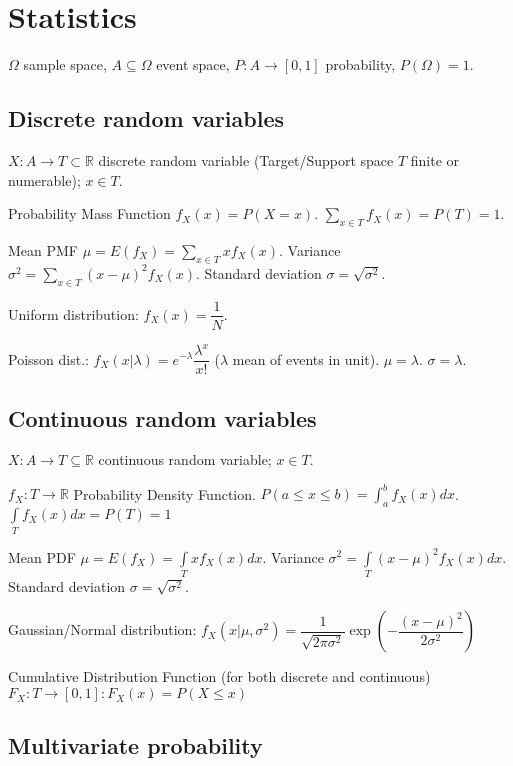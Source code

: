 \documentclass[]{article}
\begin{document}
	
	\section{Statistics}
	
	$\Omega$ sample space, $A \subseteq \Omega$ event space, $P:A\to[0,1]$ probability, $P(\Omega)=1$.
	
	\subsection{Discrete random variables}
	
	$X:A\to T\subset\mathbb{R}$ discrete random variable (Target/Support space $T$ finite or numerable); $x\in T$.
	
	Probability Mass Function $f_X(x) = P(X=x)$.
	$\sum\limits_{x \in T} f_X(x) = P(T) = 1$.
	
	Mean PMF $\mu=E(f_X)=\sum\limits_{x \in T}x f_X(x)$.
	Variance $\sigma^2 = \sum\limits_{x \in T} (x-\mu)^2 f_X(x)$.
	Standard deviation $\sigma=\sqrt{\sigma^2}$.
	
	Uniform distribution: $f_X(x)=\dfrac{1}{N}$.
	
	Poisson dist.: $f_X(x|\lambda)=e^{-\lambda}\dfrac{\lambda^x}{x!}$ ($\lambda$ mean of events in unit).
	$\mu=\lambda$. $\sigma=\lambda$.
	
	\subsection{Continuous random variables}
	
	$X:A\to T\subseteq\mathbb{R}$ continuous random variable; $x\in T$.
	
	$f_X:T\to\mathbb{R}$ Probability Density Function.
	$P(a\le x\le b) = \int_{a}^{b}f_X(x)dx$.
	$\int\limits_T f_X(x) dx = P(T) = 1$
	
	Mean PDF $\mu = E(f_X) = \int\limits_T x f_X(x) dx$.
	Variance $\sigma^2 = \int\limits_T (x-\mu)^2 f_X(x)dx$.
	Standard deviation $\sigma=\sqrt{\sigma^2}$.
	
	Gaussian/Normal distribution: $f_X(x|\mu,\sigma^2)=\dfrac{1}{\sqrt{2\pi\sigma^2}}\exp\left(-\dfrac{(x-\mu)^2}{2\sigma^2}\right)$
	
	Cumulative Distribution Function (for both discrete and continuous) $F_X:T\to[0,1]: F_X(x) = P(X\le x)$
	
	\subsection{Multivariate probability}
	
\end{document}
